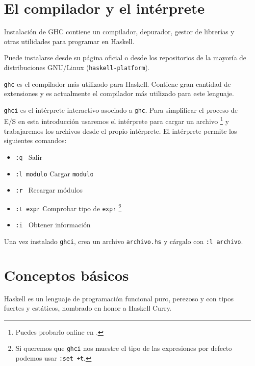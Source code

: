 \section {El compilador y el intérprete}

\begin{otro}{Instalación de GHC}
contiene un compilador, depurador, gestor de librerías y otras utilidades
para programar en Haskell.

Puede instalarse desde su página oficial o desde los
repositorios de la mayoría de distribuciones GNU/Linux
(\texttt{haskell-platform}).
\end{otro}

\texttt{ghc} es el compilador más utilizado para Haskell. Contiene gran cantidad
de extensiones y es actualmente el compilador más utilizado para este lenguaje.

\texttt{ghci} es el intérprete interactivo asociado a \texttt{ghc}.
Para simplificar el proceso de E/S en esta introducción usaremos el intérprete
para cargar un archivo \footnote{Puedes probarlo online en .}
y trabajaremos los archivos desde el propio intérprete.
El intérprete permite los siguientes comandos:

\begin{itemize}
 \item \texttt{:q \phantom{modulo}} \qquad  Salir
 \item \texttt{:l modulo} \qquad  Cargar \texttt{modulo}
 \item \texttt{:r \phantom{modulo}} \qquad  Recargar módulos
 \item \texttt{:t expr\phantom{lo}} \qquad  Comprobar tipo de \texttt{expr} \footnote{
 Si queremos que \texttt{ghci} nos muestre el tipo de las expresiones por defecto
 podemos usar \texttt{:set +t}.}
 \item \texttt{:i \phantom{modulo}} \qquad  Obtener información
\end{itemize}

Una vez instalado \texttt{ghci}, crea un archivo \texttt{archivo.hs} y
cárgalo con \texttt{:l archivo}.

\section{Conceptos básicos}

Haskell es un lenguaje de programación funcional puro, perezoso y con tipos fuertes
y estáticos, nombrado en honor a Haskell Curry.

